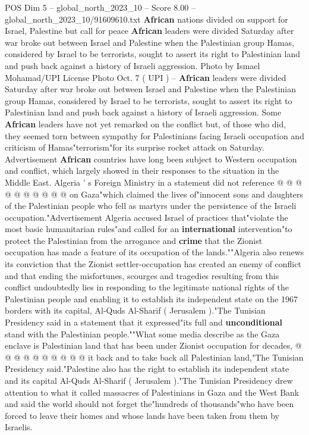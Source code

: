 \begin{textsample}{POS Dim 5 – global\_north\_2023\_10 – Score 8.00 – global\_north\_2023\_10/91609610.txt}  \label{ex:f5_pos_439}
\textbf{African} nations divided on support for Israel, Palestine but call for peace \textbf{African} leaders were divided Saturday after war broke out between Israel and Palestine when the Palestinian group Hamas, considered by Israel to be terrorists, sought to assert its right to Palestinian land and push back against a history of Israeli aggression.
Photo by Ismael Mohamad/UPI License Photo Oct. 7 ( UPI ) -- \textbf{African} leaders were divided Saturday after war broke out between Israel and Palestine when the Palestinian group Hamas, considered by Israel to be terrorists, sought to assert its right to Palestinian land and push back against a history of Israeli aggression.
Some \textbf{African} leaders have not yet remarked on the conflict but, of those who did, they seemed torn between sympathy for Palestinians facing Israeli occupation and criticism of Hamas"terrorism"for its surprise rocket attack on Saturday.
Advertisement \textbf{African} countries have long been subject to Western occupation and conflict, which largely showed in their responses to the situation in the Middle East.
Algeria ' s Foreign Ministry in a statement did not reference @ @ @ @ @ @ @ @ @ @ on Gaza"which claimed the lives of"innocent sons and daughters of the Palestinian people who fell as martyrs under the persistence of the Israeli occupation."Advertisement Algeria accused Israel of practices that"violate the most basic humanitarian rules"and called for an \textbf{international} intervention"to protect the Palestinian from the arrogance and \textbf{crime} that the Zionist occupation has made a feature of its occupation of the lands.""Algeria also renews its conviction that the Zionist settler-occupation has created an enemy of conflict and that ending the misfortunes, scourges and tragedies resulting from this conflict undoubtedly lies in responding to the legitimate national rights of the Palestinian people and enabling it to establish its independent state on the 1967 borders with its capital, Al-Quds Al-Sharif ( Jerusalem )."The Tunisian Presidency said in a statement that it expressed"its full and \textbf{unconditional} stand with the Palestinian people.""What some media describe as the Gaza enclave is Palestinian land that has been under Zionist occupation for decades, @ @ @ @ @ @ @ @ @ @ it back and to take back all Palestinian land,"The Tunisian Presidency said."Palestine also has the right to establish its independent state and its capital Al-Quds Al-Sharif ( Jerusalem )."The Tunisian Presidency drew attention to what it called massacres of Palestinians in Gaza and the West Bank and said the world should not forget the"hundreds of thousands"who have been forced to leave their homes and whose lands have been taken from them by Israelis.

\end{textsample}
